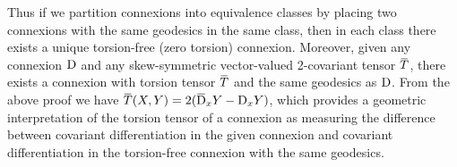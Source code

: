 \documentclass[../main]{subfiles}
\begin{document}
Thus if we partition connexions into equivalence classes by placing two connexions with the same geodesics in the same class, then in each class there exists a unique torsion-free (zero torsion) connexion. Moreover, given any connexion $\mathrm{D}$ and any skew-symmetric vector-valued 2-covariant tensor $\xoverline{T}$, there exists a connexion with torsion tensor $\xoverline{T}$ and the same geodesics as $\mathrm{D}$. From the above proof we have $\xoverline{T}(X, Y)=2(\covariant_{x} Y-\connection_{x} Y)$, which provides a geometric interpretation of the torsion tensor of a connexion as measuring the difference between covariant differentiation in the given connexion and covariant differentiation in the torsion-free connexion with the same geodesics.
\end{document}
